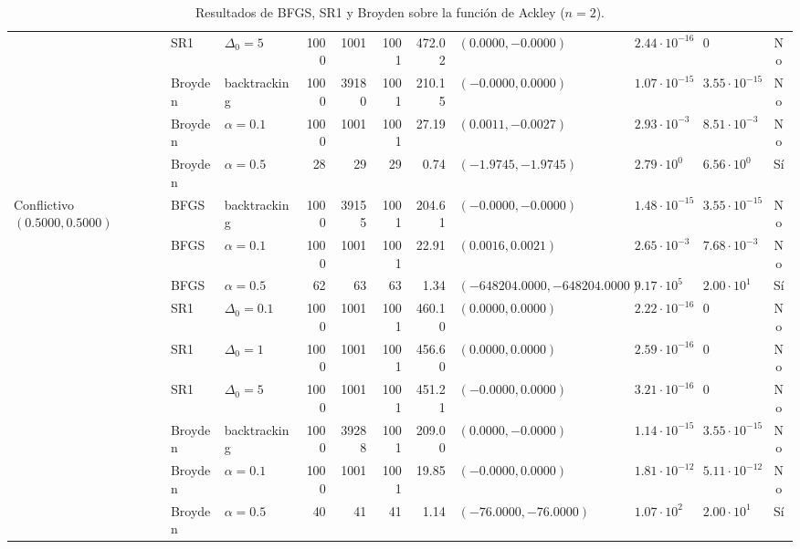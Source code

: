 \begin{table}[htbp]
{\begin{tabular}{lllrrrrlllc}
 & SR1 & $\Delta_0 = 5$ & 1000 & 1001 & 1001 & 472.02 & $(0.0000, -0.0000)$ & $2.44\cdot 10^{-16}$ & $0$ & No \\
 & Broyden & backtracking & 1000 & 39180 & 1001 & 210.15 & $(-0.0000, 0.0000)$ & $1.07\cdot 10^{-15}$ & $3.55\cdot 10^{-15}$ & No \\
 & Broyden & $\alpha = 0.1$ & 1000 & 1001 & 1001 & 27.19 & $(0.0011, -0.0027)$ & $2.93\cdot 10^{-3}$ & $8.51\cdot 10^{-3}$ & No \\
 & Broyden & $\alpha = 0.5$ & 28 & 29 & 29 & 0.74 & $(-1.9745, -1.9745)$ & $2.79\cdot 10^{0}$ & $6.56\cdot 10^{0}$ & Sí \\
\midrule
Conflictivo $(0.5000, 0.5000)$ & BFGS & backtracking & 1000 & 39155 & 1001 & 204.61 & $(-0.0000, -0.0000)$ & $1.48\cdot 10^{-15}$ & $3.55\cdot 10^{-15}$ & No \\
 & BFGS & $\alpha = 0.1$ & 1000 & 1001 & 1001 & 22.91 & $(0.0016, 0.0021)$ & $2.65\cdot 10^{-3}$ & $7.68\cdot 10^{-3}$ & No \\
 & BFGS & $\alpha = 0.5$ & 62 & 63 & 63 & 1.34 & $(-648204.0000, -648204.0000)$ & $9.17\cdot 10^{5}$ & $2.00\cdot 10^{1}$ & Sí \\
 & SR1 & $\Delta_0 = 0.1$ & 1000 & 1001 & 1001 & 460.10 & $(0.0000, 0.0000)$ & $2.22\cdot 10^{-16}$ & $0$ & No \\
 & SR1 & $\Delta_0 = 1$ & 1000 & 1001 & 1001 & 456.60 & $(0.0000, 0.0000)$ & $2.59\cdot 10^{-16}$ & $0$ & No \\
 & SR1 & $\Delta_0 = 5$ & 1000 & 1001 & 1001 & 451.21 & $(-0.0000, 0.0000)$ & $3.21\cdot 10^{-16}$ & $0$ & No \\
 & Broyden & backtracking & 1000 & 39288 & 1001 & 209.00 & $(0.0000, -0.0000)$ & $1.14\cdot 10^{-15}$ & $3.55\cdot 10^{-15}$ & No \\
 & Broyden & $\alpha = 0.1$ & 1000 & 1001 & 1001 & 19.85 & $(-0.0000, 0.0000)$ & $1.81\cdot 10^{-12}$ & $5.11\cdot 10^{-12}$ & No \\
 & Broyden & $\alpha = 0.5$ & 40 & 41 & 41 & 1.14 & $(-76.0000, -76.0000)$ & $1.07\cdot 10^{2}$ & $2.00\cdot 10^{1}$ & Sí \\
\bottomrule
\end{tabular}}
\caption{Resultados de BFGS, SR1 y Broyden sobre la función de Ackley ($n = 2$).}
\label{tab:f1}
\end{table}